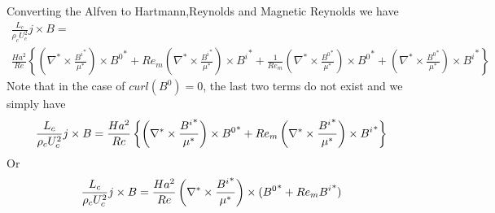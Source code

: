 \documentclass[11pt]{article}
\begin{document}
Converting the Alfven to Hartmann,Reynolds and Magnetic Reynolds we have
\begin{multline}
	 \frac{L_c}{\rho_c U_c^2} j \times B
	 = \\
	 \frac{Ha^2}{Re}
	\left\{
	\left( \nabla^* \times \frac{{B^{i}}^*}{\mu^*} \right) \times {B^0}^*
	+
	Re_m \left( \nabla^* \times \frac{{B^{i}}^*}{\mu^*} \right) \times {B^{i}}^*
	+
	\frac{1}{Re_m} \left( \nabla^* \times \frac{{B^0}^*}{\mu^*} \right) \times {B^0}^*
	+
	\left( \nabla^* \times \frac{{B^0}^*}{\mu^*} \right) \times {B^{i}}^*
	\right\}
\end{multline}
Note that in the case of $curl(B^0) = 0$, the last two terms do not exist and we simply have
\begin{equation}
	 \frac{L_c}{\rho_c U_c^2} j \times B
	 = \\
	 \frac{Ha^2}{Re}
	\left\{
	\left( \nabla^* \times \frac{{B^{i}}^*}{\mu^*} \right) \times {B^0}^*
	+
	Re_m \left( \nabla^* \times \frac{{B^{i}}^*}{\mu^*} \right) \times {B^{i}}^*
	\right\}
\end{equation}
Or
\begin{equation}
	 \frac{L_c}{\rho_c U_c^2} j \times B
	 = \\
	 \frac{Ha^2}{Re}
	\left( \nabla^* \times \frac{{B^{i}}^*}{\mu^*} \right) \times ({B^0}^*+Re_m {B^{i}}^*)
\end{equation}
\end{document}
